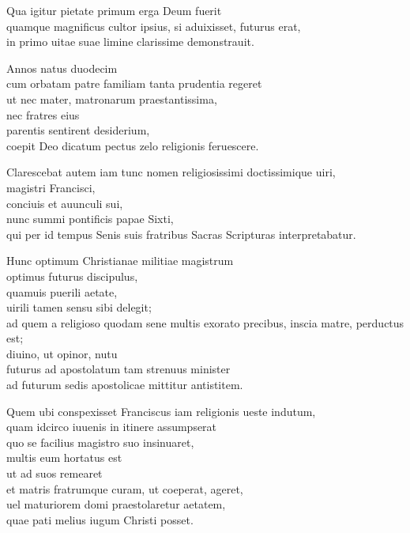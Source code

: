 \documentclass[a5paper,twoside]{article}
\begin{document}
Qua igitur pietate primum erga Deum fuerit \\
quamque magnificus cultor ipsius, si aduixisset, futurus erat, \\
in primo uitae suae limine clarissime demonstrauit. 

Annos natus duodecim \\
cum orbatam patre familiam tanta prudentia regeret \\
ut nec mater, matronarum praestantissima, \\
nec fratres eius \\
parentis sentirent desiderium, \\
coepit Deo dicatum pectus zelo religionis feruescere. 

Clarescebat autem iam tunc nomen religiosissimi doctissimique uiri, \\
magistri Francisci, \\
conciuis et auunculi sui, \\
nunc summi pontificis papae Sixti, \\
qui per id tempus Senis suis fratribus Sacras Scripturas interpretabatur. 

Hunc optimum Christianae militiae magistrum \\
optimus futurus discipulus, \\
quamuis puerili aetate, \\
uirili tamen sensu sibi delegit; \\
ad quem a religioso quodam sene multis exorato precibus, inscia matre, perductus est; \\
diuino, ut opinor, nutu \\
futurus ad apostolatum tam strenuus minister \\
ad futurum sedis apostolicae mittitur antistitem. 

Quem ubi conspexisset Franciscus iam religionis ueste indutum, \\
quam idcirco iuuenis in itinere assumpserat \\
quo se facilius magistro suo insinuaret, \\
multis eum hortatus est \\
ut ad suos remearet \\
et matris fratrumque curam, ut coeperat, ageret, \\
uel maturiorem domi praestolaretur aetatem, \\
quae pati melius iugum Christi posset. 
\end{document}
